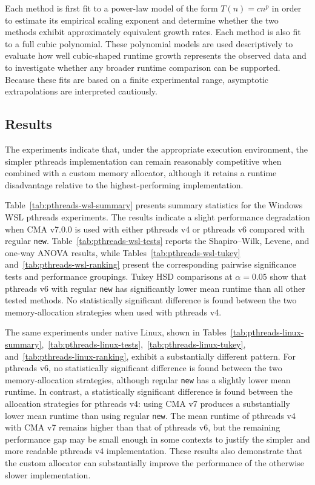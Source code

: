 Each method is first fit to a power-law model of the form $T(n)=cn^p$ in order to estimate its empirical scaling exponent and determine whether the two methods exhibit approximately equivalent growth rates. Each method is also fit to a full cubic polynomial. These polynomial models are used descriptively to evaluate how well cubic-shaped runtime growth represents the observed data and to investigate whether any broader runtime comparison can be supported. Because these fits are based on a finite experimental range, asymptotic extrapolations are interpreted cautiously.

\subsection{Results}

The experiments indicate that, under the appropriate execution environment, the simpler pthreads implementation can remain reasonably competitive when combined with a custom memory allocator, although it retains a runtime disadvantage relative to the highest-performing implementation.

Table~\ref{tab:pthreads-wsl-summary} presents summary statistics for the Windows WSL pthreads experiments. The results indicate a slight performance degradation when CMA v7.0.0 is used with either pthreads v4 or pthreads v6 compared with regular \texttt{new}. Table~\ref{tab:pthreads-wsl-tests} reports the Shapiro--Wilk, Levene, and one-way ANOVA results, while Tables~\ref{tab:pthreads-wsl-tukey} and~\ref{tab:pthreads-wsl-ranking} present the corresponding pairwise significance tests and performance groupings. Tukey HSD comparisons at $\alpha=0.05$ show that pthreads v6 with regular \texttt{new} has significantly lower mean runtime than all other tested methods. No statistically significant difference is found between the two memory-allocation strategies when used with pthreads v4.

The same experiments under native Linux, shown in Tables~\ref{tab:pthreads-linux-summary},~\ref{tab:pthreads-linux-tests},~\ref{tab:pthreads-linux-tukey}, and~\ref{tab:pthreads-linux-ranking}, exhibit a substantially different pattern. For pthreads v6, no statistically significant difference is found between the two memory-allocation strategies, although regular \texttt{new} has a slightly lower mean runtime. In contrast, a statistically significant difference is found between the allocation strategies for pthreads v4: using CMA v7 produces a substantially lower mean runtime than using regular \texttt{new}. The mean runtime of pthreads v4 with CMA v7 remains higher than that of pthreads v6, but the remaining performance gap may be small enough in some contexts to justify the simpler and more readable pthreads v4 implementation. These results also demonstrate that the custom allocator can substantially improve the performance of the otherwise slower implementation.

